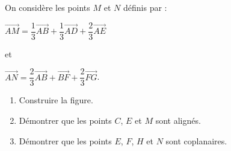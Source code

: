 \documentclass{cornouaille}
\begin{document}
\begin{exercice}
  On considère les points $M$ et $N$ définis par :

  $\overrightarrow{AM}=\dfrac{1}{3}\overrightarrow{AB}+\dfrac{1}{3}\overrightarrow{AD}+\dfrac{2}{3}\overrightarrow{AE}$

  et 

  $\overrightarrow{AN}=\dfrac{2}{3}\overrightarrow{AB}+\overrightarrow{BF}+\dfrac{2}{3}\overrightarrow{FG}$.
  \begin{enumerate}
  \item Construire la figure.
  \item Démontrer que les points $C$, $E$ et $M$ sont alignés.
  \item Démontrer que les points $E$,
    $F$, $H$ et $N$ sont coplanaires.
  \end{enumerate}
\end{exercice}
\end{document}
